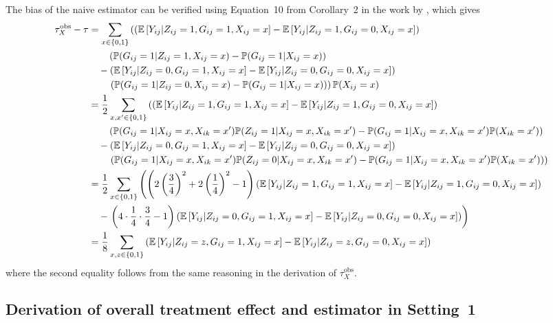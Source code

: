 \documentclass[10pt]{article}
\begin{document}
The bias of the naive estimator can be verified using Equation~10 from Corollary~2 in the work by \textcite{Forastiere:2021}, which gives
\begin{align*}
\tau_{X}^\text{obs} - \tau &= \sum_{x\in\{0,1\}} \left(\left(\mathbb{E}\left[Y_{ij}|Z_{ij}=1,G_{ij}=1,X_{ij}=x\right] - \mathbb{E}\left[Y_{ij}|Z_{ij}=1,G_{ij}=0,X_{ij}=x\right]\right)\right. \\
&\qquad \left(\mathbb{P}(G_{ij}=1|Z_{ij}=1,X_{ij}=x)-\mathbb{P}(G_{ij}=1|X_{ij}=x)\right) \\
&\quad - \left(\mathbb{E}\left[Y_{ij}|Z_{ij}=0,G_{ij}=1,X_{ij}=x\right] - \mathbb{E}\left[Y_{ij}|Z_{ij}=0,G_{ij}=0,X_{ij}=x\right]\right) \\
&\qquad \left.\left(\mathbb{P}(G_{ij}=1|Z_{ij}=0,X_{ij}=x)-\mathbb{P}(G_{ij}=1|X_{ij}=x)\right)\right)\mathbb{P}(X_{ij}=x) \\
&= \frac{1}{2}\sum_{x,x'\in\{0,1\}} \left(\left(\mathbb{E}\left[Y_{ij}|Z_{ij}=1,G_{ij}=1,X_{ij}=x\right] - \mathbb{E}\left[Y_{ij}|Z_{ij}=1,G_{ij}=0,X_{ij}=x\right]\right)\right. \\
&\qquad \left(\mathbb{P}(G_{ij}=1|X_{ij}=x,X_{ik}=x')\mathbb{P}(Z_{ij}=1|X_{ij}=x,X_{ik}=x')-\mathbb{P}(G_{ij}=1|X_{ij}=x,X_{ik}=x')\mathbb{P}(X_{ik}=x')\right) \\
&\quad - \left(\mathbb{E}\left[Y_{ij}|Z_{ij}=0,G_{ij}=1,X_{ij}=x\right] - \mathbb{E}\left[Y_{ij}|Z_{ij}=0,G_{ij}=0,X_{ij}=x\right]\right) \\
&\qquad \left.\left(\mathbb{P}(G_{ij}=1|X_{ij}=x,X_{ik}=x')\mathbb{P}(Z_{ij}=0|X_{ij}=x,X_{ik}=x')-\mathbb{P}(G_{ij}=1|X_{ij}=x,X_{ik}=x')\mathbb{P}(X_{ik}=x')\right)\right) \\
&= \frac{1}{2}\sum_{x\in\{0,1\}}\left(\left(2\left(\frac{3}{4}\right)^2+2\left(\frac{1}{4}\right)^2 - 1\right)\left(\mathbb{E}\left[Y_{ij}|Z_{ij}=1,G_{ij}=1,X_{ij}=x\right] - \mathbb{E}\left[Y_{ij}|Z_{ij}=1,G_{ij}=0,X_{ij}=x\right]\right)\right. \\
&\quad - \left.\left(4\cdot\frac{1}{4}\cdot\frac{3}{4} - 1\right)\left(\mathbb{E}\left[Y_{ij}|Z_{ij}=0,G_{ij}=1,X_{ij}=x\right] - \mathbb{E}\left[Y_{ij}|Z_{ij}=0,G_{ij}=0,X_{ij}=x\right]\right)\right) \\
&= \frac{1}{8}\sum_{x,z\in\{0,1\}}\left(\mathbb{E}\left[Y_{ij}|Z_{ij}=z,G_{ij}=1,X_{ij}=x\right] - \mathbb{E}\left[Y_{ij}|Z_{ij}=z,G_{ij}=0,X_{ij}=x\right]\right)
\end{align*}
where the second equality follows from the same reasoning in the derivation of $\tau_X^\text{obs}$.

\subsection{Derivation of overall treatment effect and estimator in Setting~1}\label{apx:setting2}
\end{document}
